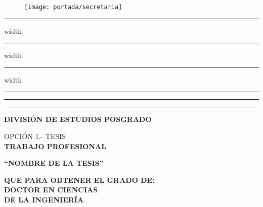 \begin{titlepage}
    \vspace*{-2cm}
    \begin{figure}[H]
        \texttt{[image: portada/secretaria]}
    \end{figure}

    \hrule height 3pt depth 0pt width \textwidth
    \vspace{2pt}
    \hrule height 6pt depth 0pt width \textwidth
    \vspace{2pt}
    \hrule height 3pt depth 0pt width \textwidth

    \begin{minipage}{15mm}
        \hspace{12pt}
        \rule{3pt}{0.7\textheight}
        \hspace{-4pt}
        \rule{6pt}{0.7\textheight}
        \hspace{-4pt}
        \rule{3pt}{0.7\textheight}
    \end{minipage}

    \begin{minipage}{20cm}
        \begin{center}
            \textbf{DIVISIÓN DE ESTUDIOS POSGRADO}
        \end{center}

        \vspace{0.2\baselineskip}
        \begin{center}
            \fontsize{11}{12}\selectfont OPCIÓN 1.- TESIS \\
            \fontsize{12}{12}\selectfont \textbf{TRABAJO PROFESIONAL}
        \end{center}

        \vspace{0.5\baselineskip}
        \begin{center}
            \textbf{``NOMBRE DE LA TESIS''}
        \end{center}

        \vspace{0.5\baselineskip}
        \begin{center}
            \fontsize{11}{12}\selectfont \textbf{QUE PARA OBTENER EL GRADO DE:} \\
            \fontsize{12}{12}\selectfont \textbf{DOCTOR EN CIENCIAS} \\
            \fontsize{12}{12}\selectfont \textbf{DE LA INGENIERÍA}
        \end{center}


\end{minipage}
\end{titlepage}
